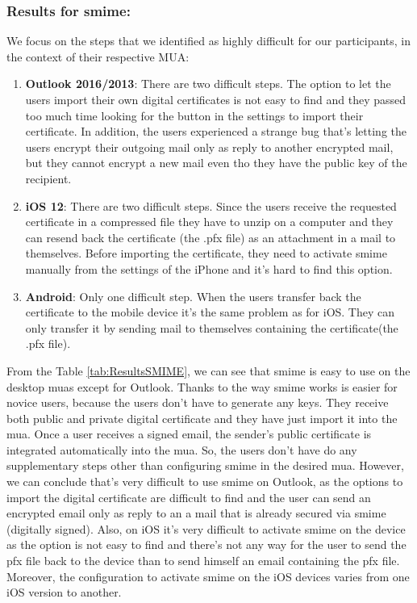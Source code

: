 \subsubsection{Results for \acrshort{smime}:}
We focus on the steps that we identified as highly difficult for our participants, in the context of their respective MUA:
\begin{enumerate}
	\item \textbf{Outlook 2016/2013}: There are two difficult steps. The option to let the users import their own digital certificates is not easy to find and they passed too much time looking for the button in the settings to import their certificate. In addition, the users experienced a strange bug that's letting the users encrypt their outgoing mail only as reply to another encrypted mail, but they cannot encrypt a new mail even tho they have the public key of the recipient.
	\item \textbf{iOS 12}: There are two difficult steps. Since the users receive the requested certificate in a compressed file they have to unzip on a computer and they can resend back the certificate (the .pfx file) as an attachment in a mail to themselves. Before importing the certificate, they need to activate \acrshort{smime} manually from the settings of the iPhone and it's hard to find this option.
	\item \textbf{Android}: Only one difficult step. When the users transfer back the certificate to the mobile device it's the same problem as for iOS. They can only transfer it by sending mail to themselves containing the certificate(the .pfx file).
\end{enumerate}
From the Table \ref{tab:ResultsSMIME}, we can see that \acrshort{smime} is easy to use on the desktop \acrshort{mua}s except for Outlook. Thanks to the way \acrshort{smime} works is easier for novice users, because the users don't have to generate any keys. They receive both public and private digital certificate and they have just import it into the \acrshort{mua}. Once a user receives a signed email, the sender's public certificate is integrated automatically into the \acrshort{mua}. So, the users don't have do any supplementary steps other than configuring \acrshort{smime} in the desired \acrshort{mua}. However, we can conclude that's very difficult to use \acrshort{smime} on Outlook, as the options to import the digital certificate are difficult to find and the user can send an encrypted email only as reply to an a mail that is already secured via \acrshort{smime} (digitally signed). Also, on iOS it's very difficult to activate \acrshort{smime} on the device as the option is not easy to find and there's not any way for the user to send the pfx file back to the device than to send himself an email containing the pfx file. Moreover, the configuration to activate \acrshort{smime} on the iOS devices varies from one iOS version to another.

